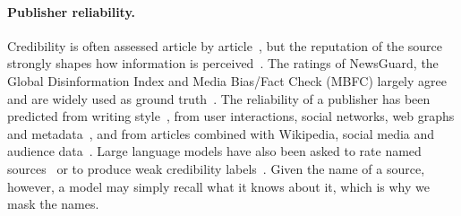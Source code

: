\documentclass[11pt,a4paper]{article}
\begin{document}
\paragraph{Publisher reliability.} Credibility is often assessed article by article~\cite{pandolfi2020automatic,
10.1145/3770077}, but the reputation of the source strongly shapes how information is
perceived~\cite{doi:10.1080/07421222.2019.1628921}. The ratings of NewsGuard, the Global Disinformation Index and Media
Bias/Fact Check (MBFC) largely agree and are widely used as ground truth~\cite{lin2023high,DBLP:conf/icwsm/PratelliP22}.
The reliability of a publisher has been predicted from writing style~\cite{przybyla2020capturing,potthast2018stylometric},
from user interactions, social networks, web graphs and
metadata~\cite{bazmi2023multi,DBLP:conf/ecir/PratelliSP25,DBLP:conf/icwsm/WilliamsCC25,DBLP:journals/jdiq/LongoZCZC25},
and from articles combined with Wikipedia, social media and audience
data~\cite{baly2018predicting,baly2020written,nakov2024survey}. Large language models have also been asked to rate named
sources~\cite{yang2023large} or to produce weak credibility labels~\cite{Leite2025}. Given the name of a source, however,
a model may simply recall what it knows about it, which is why we mask the names.
\end{document}

